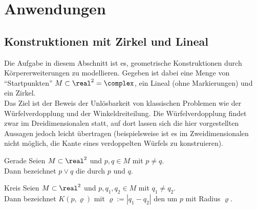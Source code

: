 \section{%
    Anwendungen%
}

\subsection{%
    Konstruktionen mit Zirkel und Lineal%
}

\begin{Bem}
    Die Aufgabe in diesem Abschnitt ist es,
    geometrische Konstruktionen durch Körpererweiterungen zu modellieren.
    Gegeben ist dabei eine Menge von "`Startpunkten"'
    $M \subset \real^2 = \complex$, ein Lineal (ohne Markierungen) und
    ein Zirkel.\\
    Das Ziel ist der Beweis der Unlösbarkeit von klassischen Problemen
    wie der Würfelverdopplung und der Winkeldreiteilung.
    Die Würfelverdopplung findet zwar im Dreidimensionalen statt, auf dort
    lassen sich die hier vorgestellten Aussagen jedoch leicht übertragen
    (beispielsweise ist es im Zweidimensionalen nicht möglich, die Kante
    eines verdoppelten Würfels zu konstruieren).
\end{Bem}

\linie

\begin{Def}{Gerade}
    Seien $M \subset \real^2$ und $p, q \in M$ mit $p \not= q$.\\
    Dann bezeichnet $p \lor q$ die  durch $p$ und $q$.
\end{Def}

\begin{Def}{Kreis}
    Seien $M \subset \real^2$ und $p, q_1, q_2 \in M$ mit $q_1 \not= q_2$.\\
    Dann bezeichnet $K(p, \varrho)$ mit $\varrho := |q_1 - q_2|$
    den  um $p$ mit Radius $\varrho$.
\end{Def}

